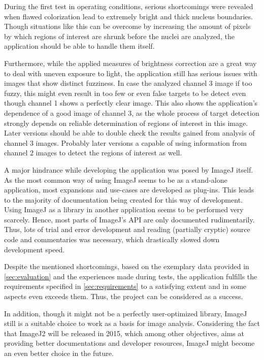 \documentclass[a4paper, 12pt]{article}
\begin{document}
During the first test in operating conditions, serious shortcomings were
revealed when flawed colorization lead to extremely bright and thick nucleus
boundaries. Though situations like this can be overcome by increasing the amount
of pixels by which regions of interest are shrunk before the nuclei are
analyzed, the application should be able to handle them itself.

Furthermore, while the applied measures of brightness correction are a great way
to deal with uneven exposure to light, the application still has serious issues
with images that show distinct fuzziness. In case the analyzed channel 3 image
if too fuzzy, this might even result in too few or even false targets to be
detect even though channel 1 shows a perfectly clear image. This also shows the
application's dependence of a good image of channel 3, as the whole process of
target detection strongly depends on reliable determination of regions of
interest in this image. Later versions should be able to double check the
results gained from analysis of channel 3 images. Probably later versions a
capable of using information from channel 2 images to detect the regions of
interest as well.

A major hindrance while developing the application was posed by ImageJ itself.
As the most common way of using ImageJ seems to be as a stand-alone application,
most expansions and use-cases are developed as plug-ins. This leads to the
majority of documentation being created for this way of development. Using
ImageJ as a library in another application seems to be performed very scarcely.
Hence, most parts of ImageJ's API are only documented rudimentarily. Thus, lots
of trial and error development and reading (partially cryptic) source code and
commentaries was necessary, which drastically slowed down development speed.

Despite the mentioned shortcomings, based on the exemplary data provided in
\ref{sec:evaluation} and the experiences made during tests, the application fulfills the requirements
specified in \ref{sec:requirements} to a satisfying extent and in some aspects
even exceeds them. Thus, the project can be considered as a success.

In addition, though it might not be a perfectly user-optimized library, ImageJ
still is a suitable choice to work as a basis for image analysis. Considering
the fact that ImageJ2 will be released in 2015, which among other
objectives, aims at providing better documentations and developer resources,
ImageJ might become an even better choice in the future.
\end{document}
